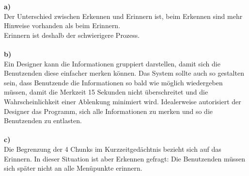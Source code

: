 
\textbf{a)}\\
Der Unterschied zwischen Erkennen und Erinnern ist, beim Erkennen sind mehr Hinweise vorhanden als beim Erinnern. 
\\Erinnern ist deshalb der schwierigere Prozess.
\\\\
\textbf{b)}\\
Ein Designer kann die Informationen gruppiert darstellen, damit sich die Benutzenden diese einfacher merken können.
Das System sollte auch so gestalten sein, 
dass Benutzende die Informationen so bald wie möglich wiedergeben müssen, 
damit die Merkzeit 15 Sekunden nicht überschreitet und die Wahrscheinlichkeit einer Ablenkung minimiert wird. 
Idealerweise autorisiert der Designer das Programm, sich alle Informationen zu merken und so die Benutzenden zu entlasten.
\\\\
\textbf{c)}\\
Die Begrenzung der 4 Chunks im Kurzzeitgedächtnis bezieht sich auf das Erinnern.
In dieser Situation ist aber Erkennen gefragt: 
Die Benutzenden müssen sich später nicht an alle Menüpunkte erinnern.